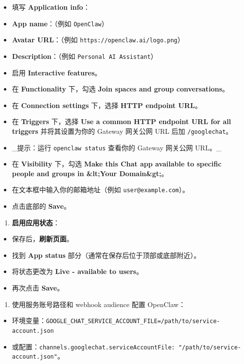 \begin{itemize}
  \item 填写 \textbf{Application info}：
  \item \textbf{App name}：（例如 \texttt{OpenClaw}）
  \item \textbf{Avatar URL}：（例如 \texttt{https://openclaw.ai/logo.png}）
  \item \textbf{Description}：（例如 \texttt{Personal AI Assistant}）
  \item 启用 \textbf{Interactive features}。
  \item 在 \textbf{Functionality} 下，勾选 \textbf{Join spaces and group conversations}。
  \item 在 \textbf{Connection settings} 下，选择 \textbf{HTTP endpoint URL}。
  \item 在 \textbf{Triggers} 下，选择 \textbf{Use a common HTTP endpoint URL for all triggers} 并将其设置为你的 Gateway 网关公网 URL 后加 \texttt{/googlechat}。
  \item \_提示：运行 \texttt{openclaw status} 查看你的 Gateway 网关公网 URL。\_
  \item 在 \textbf{Visibility} 下，勾选 \textbf{Make this Chat app available to specific people and groups in \&lt;Your Domain\&gt;}。
  \item 在文本框中输入你的邮箱地址（例如 \texttt{user@example.com}）。
  \item 点击底部的 \textbf{Save}。
\end{itemize}

\begin{enumerate}
  \item \textbf{启用应用状态}：
\end{enumerate}

\begin{itemize}
  \item 保存后，\textbf{刷新页面}。
  \item 找到 \textbf{App status} 部分（通常在保存后位于顶部或底部附近）。
  \item 将状态更改为 \textbf{Live - available to users}。
  \item 再次点击 \textbf{Save}。
\end{itemize}

\begin{enumerate}
  \item 使用服务账号路径和 webhook audience 配置 OpenClaw：
\end{enumerate}

\begin{itemize}
  \item 环境变量：\texttt{GOOGLE\_CHAT\_SERVICE\_ACCOUNT\_FILE=/path/to/service-account.json}
  \item 或配置：\texttt{channels.googlechat.serviceAccountFile: "/path/to/service-account.json"}。
\end{itemize}


